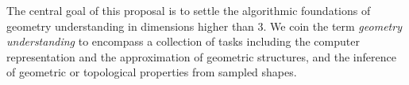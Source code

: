The central goal of this proposal is to settle the algorithmic
foundations of geometry understanding in dimensions higher than 3.  We
coin the term {\em geometry understanding} to encompass a collection
of tasks including the computer representation and the approximation
of geometric structures, and the inference of geometric or topological
properties from sampled
shapes.  %


